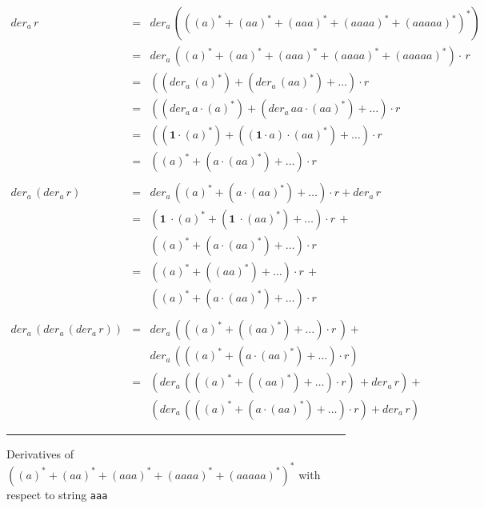 \documentclass[12pt]{article}
\newcommand{\ONE}{\textbf{1}}
\newcommand{\der}{\textit{der}}
\begin{document}
\begin{figure}[ht]
  \begin{center}
    \[
    \begin{array}{rcl}
      \der_a\, r          & = &  \der_a\,( ((a)^* + (aa)^* + (aaa)^* + (aaaa)^* + (aaaaa)^* )^*) \\
                          & = & \der_a\, ((a)^* + (aa)^* + (aaa)^* + (aaaa)^* + (aaaaa)^* ) \cdot \, r \\  
                          & = & ((\der_a\, (a)^*) + (\der_a\, (aa)^*)+ \dots ) \cdot  r \\
                          & = & ((\der_a\, a \cdot (a)^*) + (\der_a\,aa \cdot (aa)^*)+ \dots ) \cdot  r \\
                          & = & ((\ONE \cdot (a)^*) + ((\ONE \cdot a) \cdot (aa)^*)+ \dots ) \cdot  r\\
                          & = & ((a)^* + (a \cdot (aa)^*)+ \dots ) \cdot  r \\\\

      \der_a\, (\der_a\, r) & = & \der_a\, ((a)^* + (a \cdot (aa)^*)+ \dots ) \cdot r + \der_a\,r \\
                            & = & (\ONE\ \cdot (a)^* + (\ONE\ \cdot (aa)^*)+ \dots ) \cdot r \,+ \\
                            &   &  ((a)^* + (a \cdot (aa)^*)+ \dots ) \cdot  r \\ 
                            & = & ((a)^* + ((aa)^*)+ \dots ) \cdot r \,+ \\
                            &   &  ((a)^* + (a \cdot (aa)^*)+ \dots ) \cdot  r \\\\ 
                            
                        
     \der_a\,( \der_a\, (\der_a\, r)) & =           & \der_a\, (((a)^* + ((aa)^*)+ \dots ) \cdot r \,)+ \\
                            &             &  \der_a\,(((a)^* + (a \cdot (aa)^*)+ \dots ) \cdot  r )  \\
                            & =           & (\der_a\, (((a)^* + ((aa)^*)+ \dots ) \cdot r) \, + \der_a\, r )+\\
                            &             & ( \der_a\,(((a)^* + (a \cdot (aa)^*)+ \dots ) \cdot  r) + der_a\, r)                     
            \end{array}
    \]
    \mbox{}
    \rule{\linewidth}{0.4pt}
\caption{Derivatives of $((a)^* + (aa)^* + (aaa)^* + (aaaa)^* + (aaaaa)^* )^*$ with respect to string \texttt{aaa}}\label{derivativeStarsExample}
  \end{center}
\end{figure}
\end{document}
